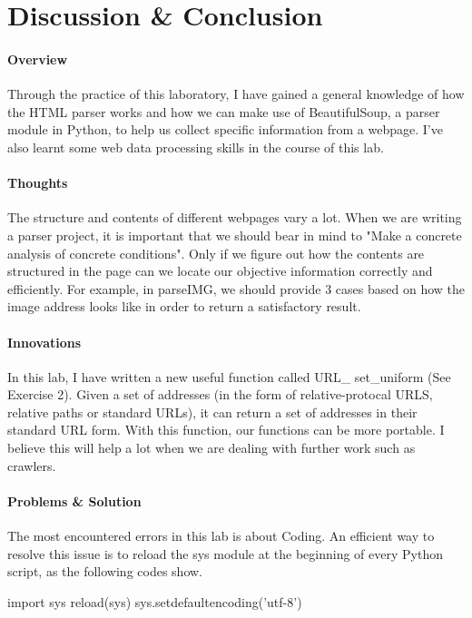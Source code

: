 \documentclass{article}
\begin{document}
\section{Discussion \& Conclusion}
\paragraph{Overview}
Through the practice of this laboratory, I have gained a general knowledge of how the HTML parser works and how we can make use of BeautifulSoup, a parser module in Python, to help us collect specific information from a webpage. I've also learnt some web data processing skills in the course of this lab.

\paragraph{Thoughts}
The structure and contents of different webpages vary a lot. When we are writing a parser project, it is important that we should bear in mind to "Make a concrete analysis of concrete conditions".  Only if we figure out how the contents are structured in the page can we locate our objective information correctly and efficiently. For example, in parseIMG, we should provide 3 cases based on how the image address looks like in order to return a satisfactory result.

\paragraph{Innovations}
In this lab, I have written a new useful function called URL\_ set\_uniform (See Exercise 2). Given a set of addresses (in the form of relative-protocal URLS, relative paths or standard URLs), it can return a set of addresses in their standard URL form. With this function, our functions can be more portable. I believe this will help a lot when we are dealing with further work such as crawlers.


\paragraph{Problems \& Solution}
The most encountered errors in this lab is about Coding. An efficient way to resolve this issue is to reload the sys module at the beginning of every Python script, as the following codes show.

\begin{python}
import sys
reload(sys)
sys.setdefaultencoding('utf-8')
\end{python}
\end{document}

